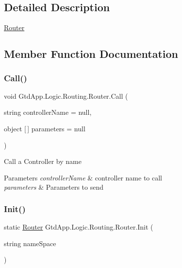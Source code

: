 \subsection{Detailed Description}
\mbox{\hyperlink{class_gtd_app_1_1_logic_1_1_routing_1_1_router}{Router}} 



\subsection{Member Function Documentation}
\mbox{\label{class_gtd_app_1_1_logic_1_1_routing_1_1_router_a01503f32282823f3e363f0255ba50c86}} 
\subsubsection{\texorpdfstring{Call()}{Call()}}
{\footnotesize\ttfamily void Gtd\+App.\+Logic.\+Routing.\+Router.\+Call (\begin{DoxyParamCaption}\item[{string}]{controller\+Name = {\ttfamily null},  }\item[{object \mbox{[}$\,$\mbox{]}}]{parameters = {\ttfamily null} }\end{DoxyParamCaption})}



Call a Controller by name 


\begin{DoxyParams}{Parameters}
{\em controller\+Name} & controller name to call\\
\hline
{\em parameters} & Parameters to send\\
\hline
\end{DoxyParams}
\mbox{\label{class_gtd_app_1_1_logic_1_1_routing_1_1_router_a46a2fedb41623573e86f0a7d3139aefd}} 
\subsubsection{\texorpdfstring{Init()}{Init()}}
{\footnotesize\ttfamily static \mbox{\hyperlink{class_gtd_app_1_1_logic_1_1_routing_1_1_router}{Router}} Gtd\+App.\+Logic.\+Routing.\+Router.\+Init (\begin{DoxyParamCaption}\item[{string}]{name\+Space }\end{DoxyParamCaption})\hspace{0.3cm}{\ttfamily [static]}}




